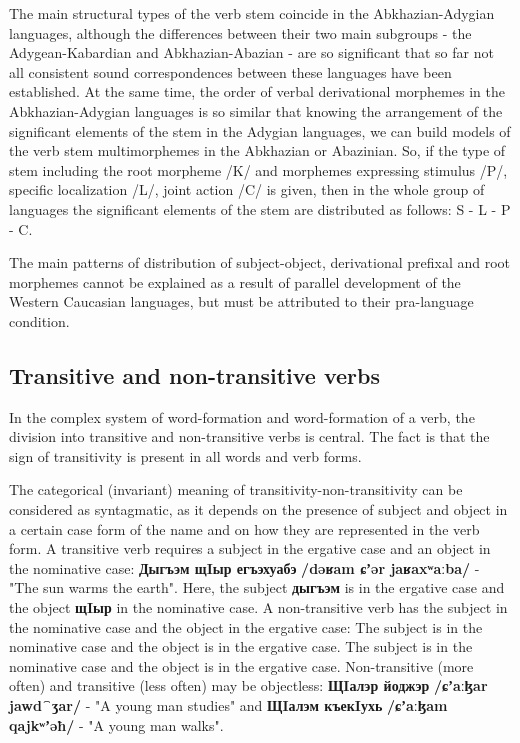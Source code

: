 \documentclass[a4paper,12pt]{book}
\newcommand{\1}[1]{\textbf{\emph{#1}}} %
\newcommand{\2}[1]{\textbf{[#1]}} %
\newcommand{\3}[1]{\fontsize{11pt}{0cm}\textbf{\emph{#1}}} %
\newcommand{\4}[1]{\fontsize{10pt}{0cm}\emph{#1}}	%
\newcommand{\5}[1]{\textbf{/#1/}} %
\newcommand{\6}[1]{\textbf{[#1]}} %
\newcommand{\7}[1]{\fontsize{12pt}{0cm}\emph{#1}} %
\newcommand{\8}[1]{\fontsize{12pt}{0cm}`#1'} %
\newcommand{\9}[1]{\fontsize{12pt}{0cm}(lit. `#1')} %
\newcommand{\glossphonemics}[1]{\textbf{/#1/}} %
\begin{document}
The main structural types of the verb stem coincide in the Abkhazian-Adygian languages, although the differences between their two main subgroups - the Adygean-Kabardian and Abkhazian-Abazian - are so significant that so far not all consistent sound correspondences between these languages have been established. At the same time, the order of verbal derivational morphemes in the Abkhazian-Adygian languages is so similar that knowing the arrangement of the significant elements of the stem in the Adygian languages, we can build models of the verb stem multimorphemes in the Abkhazian or Abazinian. So, if the type of stem including the root morpheme /K/ and morphemes expressing stimulus /P/, specific localization /L/, joint action /C/ is given, then in the whole group of languages the significant elements of the stem are distributed as follows: S - L - P - C.

The main patterns of distribution of subject-object, derivational prefixal and root morphemes cannot be explained as a result of parallel development of the Western Caucasian languages, but must be attributed to their pra-language condition.\\
\subsection{Transitive and non-transitive verbs}
In the complex system of word-formation and word-formation of a verb, the division into transitive and non-transitive verbs is central. The fact is that the sign of transitivity is present in all words and verb forms.

The categorical (invariant) meaning of transitivity-non-transitivity can be considered as syntagmatic, as it depends on the presence of subject and object in a certain case form of the name and on how they are represented in the verb form. A transitive verb requires a subject in the ergative case and an object in the nominative case: \textbf{Дыгъэм щIыр егъэхуабэ} \glossphonemics{dəʁam ɕʼər jaʁaxʷaːba} - "The sun warms the earth". Here, the subject \textbf{дыгъэм} is in the ergative case and the object \textbf{щIыр} in the nominative case. A non-transitive verb has the subject in the nominative case and the object in the ergative case: The subject is in the nominative case and the object is in the ergative case. The subject is in the nominative case and the object is in the ergative case. Non-transitive (more often) and transitive (less often) may be objectless: \textbf{ЩIалэр йоджэр} \glossphonemics{ɕʼaːɮar jawd⁀ʒar} - "A young man studies" and \textbf{ЩIалэм къекIухь} \glossphonemics{ɕʼaːɮam qajkʷʼəħ} - "A young man walks".
\end{document}
